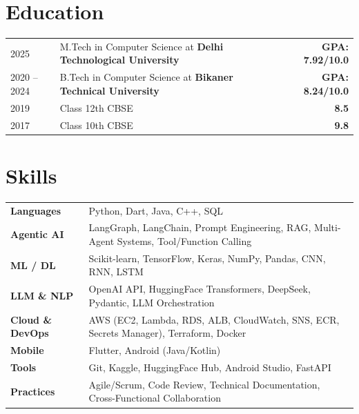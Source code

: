 \documentclass[a4paper,10pt]{article}
\begin{document}
\section{Education}
\noindent
\begin{tabularx}{\linewidth}{@{} l X r @{}}
    2025 & M.Tech in Computer Science at \textbf{Delhi Technological University} & \small\textbf{GPA: 7.92/10.0} \\
    2020 -- 2024 & B.Tech in Computer Science at \textbf{Bikaner Technical University} & \small\textbf{GPA: 8.24/10.0} \\
    2019 & Class 12th CBSE & \small\textbf{8.5} \\
    2017 & Class 10th CBSE & \small\textbf{9.8} \\
\end{tabularx}

\section{Skills}
\noindent
\begin{tabularx}{\linewidth}{@{} p{3.2cm} X @{}}
    \textbf{Languages} & Python, Dart, Java, C++, SQL \\
    \textbf{Agentic AI} & LangGraph, LangChain, Prompt Engineering, RAG, Multi-Agent Systems, Tool/Function Calling \\
    \textbf{ML / DL} & Scikit-learn, TensorFlow, Keras, NumPy, Pandas, CNN, RNN, LSTM \\
    \textbf{LLM \& NLP} & OpenAI API, HuggingFace Transformers, DeepSeek, Pydantic, LLM Orchestration \\
    \textbf{Cloud \& DevOps} & AWS (EC2, Lambda, RDS, ALB, CloudWatch, SNS, ECR, Secrets Manager), Terraform, Docker \\
    \textbf{Mobile} & Flutter, Android (Java/Kotlin) \\
    \textbf{Tools} & Git, Kaggle, HuggingFace Hub, Android Studio, FastAPI \\
    \textbf{Practices} & Agile/Scrum, Code Review, Technical Documentation, Cross-Functional Collaboration \\
\end{tabularx}
\end{document}
